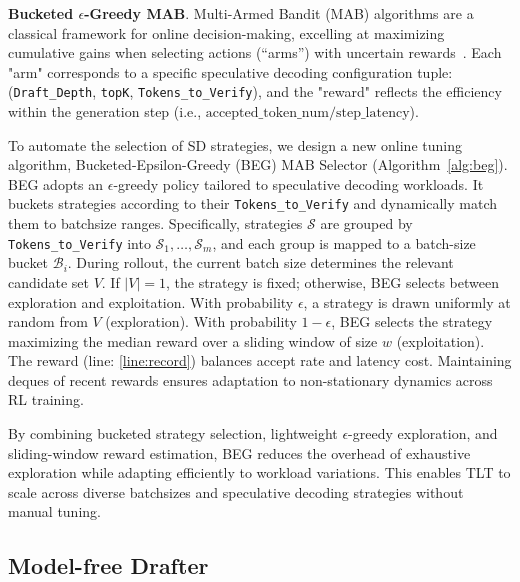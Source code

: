 \documentclass[sigplan,screen]{acmart}
\newcommand{\SysName}{\textrm{TLT}\xspace}
\begin{document}
%

%


\noindent\textbf{Bucketed $\epsilon$-Greedy MAB}.
Multi-Armed Bandit (MAB) algorithms are a classical framework for online decision-making, excelling at maximizing cumulative gains when selecting actions (“arms”) with uncertain rewards~\cite{MABResourceAllocation, MAB}. Each "arm" corresponds to a specific speculative decoding configuration tuple: {(\texttt{Draft\_Depth}, \texttt{topK}, \texttt{Tokens\_to\_Verify})}, and the "reward" reflects the efficiency within the generation step (i.e., $\text{accepted\_token\_num} / \text{step\_latency}$). 

To automate the selection of SD strategies, we design a new online tuning algorithm, Bucketed-Epsilon-Greedy (BEG) MAB Selector (Algorithm~\ref{alg:beg}). BEG adopts an $\epsilon$-greedy policy tailored to speculative decoding workloads. It buckets strategies according to their \texttt{Tokens\_to\_Verify} and dynamically match them to batchsize ranges. Specifically, strategies $\mathcal{S}$ are grouped by \texttt{Tokens\_to\_Verify} into ${\mathcal{S}_1,\dots,\mathcal{S}_m}$, and each group is mapped to a batch-size bucket $\mathcal{B}_i$. During rollout, the current batch size determines the relevant candidate set $V$. If $|V|=1$, the strategy is fixed; otherwise, BEG selects between exploration and exploitation. With probability $\epsilon$, a strategy is drawn uniformly at random from $V$ (exploration). With probability $1-\epsilon$, BEG selects the strategy maximizing the median reward over a sliding window of size $w$ (exploitation). The reward (line: \ref{line:record}) balances accept rate and latency cost. Maintaining deques of recent rewards ensures adaptation to non-stationary dynamics across RL training.

By combining bucketed strategy selection, lightweight $\epsilon$-greedy exploration, and sliding-window reward estimation, BEG reduces the overhead of exhaustive exploration while adapting efficiently to workload variations. This enables \SysName to scale across diverse batchsizes and speculative decoding strategies without manual tuning.


\vspace{-10pt}
\subsection{Model-free Drafter}
\label{subsec_model_free_drafter}
\end{document}
